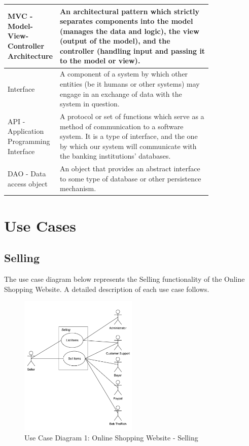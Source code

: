 \documentclass[11pt]{article}
\newcounter{use case ID}
\begin{document}
\begin{table}[H]
\begin{center}
{\begin{tabular}{|l|p{0.8\linewidth}|}
                \hline
                MVC - Model-View-Controller Architecture & An architectural pattern which strictly separates components into the model (manages the data and logic), the view (output of the model), and the controller (handling input and passing it to the model or view).\\
                \hline
                Interface & A component of a system by which other entities (be it humans or other systems) may engage in an exchange of data with the system in question. \\
                \hline
                API - Application Programming Interface & A protocol or set of functions which serve as a method of communication to a software system. It is a type of interface, and the one by which our system will communicate with the banking institutions' databases. \\
                \hline
                DAO - Data access object & An object that provides an abstract interface to some type of database or other persistence mechanism.\\
                \hline

            \end{tabular}}
    \end{center}
\end{table}

\clearpage


\section{Use Cases}
\subsection{Selling}

The use case diagram below represents the Selling functionality of the Online Shopping Website. A detailed description of each use case follows. 

\begin{figure}[htbp]
    \centering
    \includegraphics[width=0.5\textwidth]{ucd1.png}
    \caption{Use Case Diagram 1: Online Shopping Website - Selling }
    \label{fig:ucd1}
\end{figure}
\end{document}
